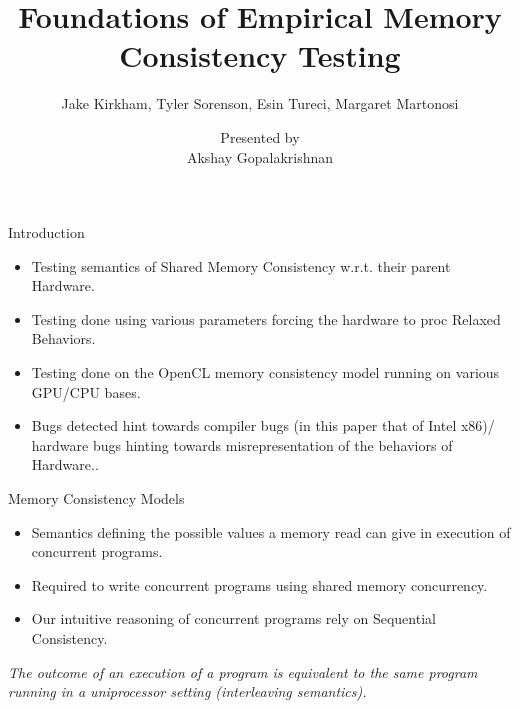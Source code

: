 \documentclass{beamer}
\title{Foundations of Empirical Memory Consistency Testing}
\subtitle{Jake Kirkham, Tyler Sorenson, Esin Tureci, Margaret Martonosi}
\author{Presented by \\ Akshay Gopalakrishnan}
\institute{McGill University}
\begin{document}
    
    \begin{frame}

        \titlepage

    \end{frame}

    \begin{frame}{Introduction}

        \begin{itemize}
            \item Testing semantics of Shared Memory Consistency w.r.t. their parent Hardware.
            \item Testing done using various parameters forcing the hardware to proc Relaxed Behaviors.
            \item Testing done on the OpenCL memory consistency model running on various GPU/CPU bases.
            \item Bugs detected hint towards compiler bugs (in this paper that of Intel x86)/ hardware bugs hinting towards misrepresentation of the behaviors of Hardware..  
        \end{itemize}

    \end{frame}

    \begin{frame}{Memory Consistency Models}

        \begin{itemize}
            \item Semantics defining the possible values a memory read can give in execution of concurrent programs. 
            \item Required to write concurrent programs using shared memory concurrency.
            \item Our intuitive reasoning of concurrent programs rely on Sequential Consistency. 
        \end{itemize}
        
        \textit{The outcome of an execution of a program is equivalent to the same program running in a uniprocessor setting (interleaving semantics).}

    \end{frame}
\end{document}
